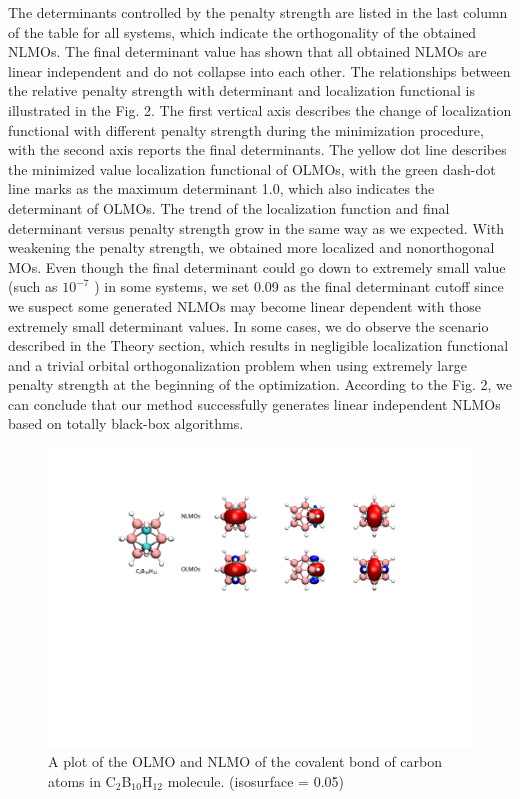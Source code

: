 \documentclass[aps,prl,reprint,amsmath,amssymb]{revtex4-1}
\begin{document}

The determinants controlled by the penalty strength are listed in the last column of the table for all systems, which indicate the orthogonality of the obtained NLMOs.
The final determinant value has shown that all obtained NLMOs are linear independent and do not collapse into each other.
The relationships between the relative penalty strength with determinant and localization functional is illustrated in the Fig. 2.
The first vertical axis describes the change of localization functional with different penalty strength during the minimization procedure, with the second axis reports the final determinants.
The yellow dot line describes the minimized value localization functional of OLMOs, with the green dash-dot line marks as the maximum determinant 1.0, which also indicates the determinant of OLMOs.
The trend of the localization function and final determinant versus penalty strength grow in the same way as we expected.
With weakening the penalty strength, we obtained more localized and nonorthogonal MOs.
Even though the final determinant could go down to extremely small value (such as $10^{-7}$ ) in some systems, we set 0.09 as the final determinant cutoff since we suspect some generated NLMOs may become linear dependent with those extremely small determinant values.
In some cases, we do observe the scenario described in the Theory section, which results in negligible localization functional and a trivial orbital orthogonalization problem when using extremely large penalty strength at the beginning of the optimization.
According to the Fig. 2, we can conclude that our method successfully generates linear independent NLMOs based on totally black-box algorithms.

\begin{figure}[hbpt]
\centering
\includegraphics[width=\textwidth]{figure_3.pdf}
\caption{A plot of the OLMO and NLMO of the covalent bond of carbon atoms in C$_2$B$_{10}$H$_{12}$ molecule. (isosurface = 0.05)}
\end{figure}
\end{document}
